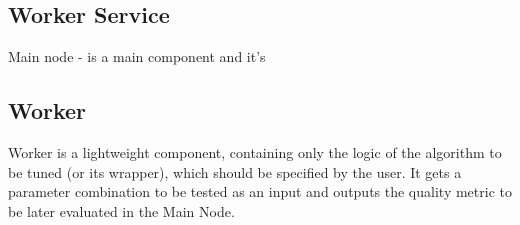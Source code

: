\subsection{Worker Service}
Main node - is a main component and it's 

\subsection{Worker}
Worker is a lightweight component, containing only the logic of the algorithm to be tuned (or its wrapper), which should be specified by the user. It gets a parameter combination to be tested as an input and outputs the quality metric to be later evaluated in the Main Node. 








